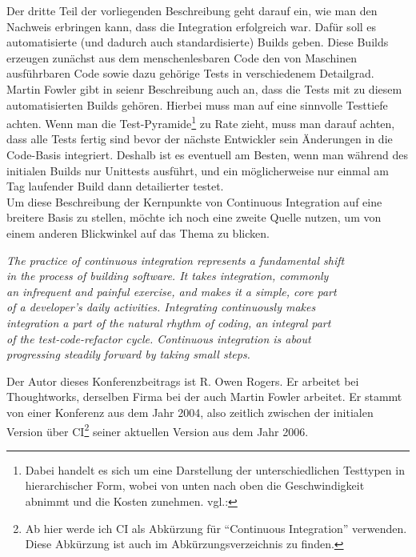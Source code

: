 Der dritte Teil der vorliegenden Beschreibung geht darauf ein, wie man den Nachweis erbringen kann, dass die Integration erfolgreich war. Dafür soll es automatisierte (und dadurch auch standardisierte) Builds geben. Diese Builds erzeugen zunächst aus dem menschenlesbaren Code den von Maschinen ausführbaren Code sowie dazu gehörige Tests in verschiedenem Detailgrad. Martin Fowler gibt in seienr Beschreibung auch an, dass die Tests mit zu diesem automatisierten Builds gehören. Hierbei muss man auf eine sinnvolle Testtiefe achten. Wenn man die Test-Pyramide\footnote{Dabei handelt es sich um eine Darstellung der unterschiedlichen Testtypen in hierarchischer Form, wobei von unten nach oben die Geschwindigkeit abnimmt und die Kosten zunehmen. vgl.:\cite{fowler-Testpyramid}} zu Rate zieht, muss man darauf achten, dass alle Tests fertig sind bevor der nächste Entwickler sein Änderungen in die Code-Basis integriert. Deshalb ist es eventuell am Besten, wenn man während des initialen Builds nur Unittests ausführt, und ein möglicherweise nur einmal am Tag laufender Build dann detailierter testet.\\
Um diese Beschreibung der Kernpunkte von Continuous Integration auf eine breitere Basis zu stellen, möchte ich noch eine zweite Quelle nutzen, um von einem anderen Blickwinkel auf das Thema zu blicken.
\begin{center}
	\textit{
The practice of continuous integration represents a fundamental shift\\ in the process of building software. It takes integration, commonly\\
an infrequent and painful exercise, and makes it a simple, core part\\ of a developer’s daily activities. Integrating continuously makes\\ integration a part of the natural rhythm of coding, an integral part\\ of the test-code-refactor cycle. Continuous integration is about\\ progressing steadily forward by taking small steps.}\\ \cite{10.1007/978-3-540-24853-8_8}
\end{center}
Der Autor dieses Konferenzbeitrags ist R. Owen Rogers. Er arbeitet bei Thoughtworks, derselben Firma bei der auch Martin Fowler arbeitet. Er stammt von einer Konferenz aus dem Jahr 2004, also zeitlich zwischen der initialen Version über CI\footnote{Ab hier werde ich CI als Abkürzung für "`Continuous Integration"' verwenden. Diese Abkürzung ist auch im Abkürzungsverzeichnis zu finden.} seiner aktuellen Version aus dem Jahr 2006.\\

